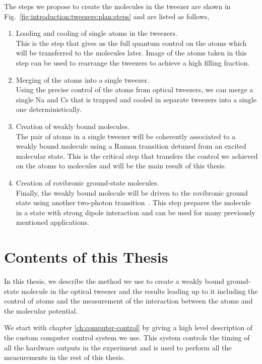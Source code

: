 The steps we propose to create the molecules in the tweezer are shown in
Fig.~\ref{fig:introduction:tweezers:plan:steps} and are listed as follows,
\begin{enumerate}
\item Loading and cooling of single atoms in the tweezers.\\
  This is the step that gives us the full quantum control on the atoms
  which will be transferred to the molecules later.
  Image of the atoms taken in this step can be used to rearrange the tweezers
  to achieve a high filling fraction.
\item Merging of the atoms into a single tweezer.\\
  Using the precise control of the atoms from optical tweezers,
  we can merge a single Na and Cs that is trapped and cooled in separate tweezers
  into a single one deterministically.
\item Creation of weakly bound molecules.\\
  The pair of atoms in a single tweezer will be coherently associated
  to a weakly bound molecule using a Raman transition detuned from an excited molecular state.
  This is the critical step that transfers the control we achieved
  on the atoms to molecules and will be the main result of this thesis.
\item Creation of rovibronic ground-state molecules.\\
  Finally, the weakly bound molecule will be driven to the rovibronic ground state
  using another two-photon transition~\cite{bergmann_coherent_1998}.
  This step prepares the molecule in a state with strong dipole interaction
  and can be used for many previously mentioned applications.
\end{enumerate}

\section{Contents of this Thesis}
\label{ch:introduction:contents}

In this thesis, we describe the method we use to create a weakly bound ground-state molecule
in the optical tweezer and the results leading up to it including the control of atoms
and the measurement of the interaction between the atoms and the molecular potential.

We start with chapter \ref{ch:computer-control} by giving a high level description of
the custom computer control system we use.
This system controls the timing of all the hardware outputs in the experiment
and is used to perform all the measurements in the rest of this thesis.

